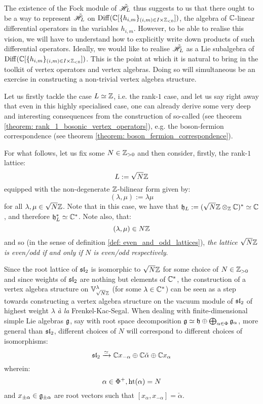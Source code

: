         The existence of the Fock module of $\tilde{\scrH}_L$ thus suggests to us that there ought to be a way to represent $\tilde{\scrH}_L$ on $\Diff(\bbC[ \{h_{i, m}\}_{(i, m) \in I \x \Z_{< 0}} ])$, the algebra of $\bbC$-linear differential operators in the variables $h_{i, m}$. However, to be able to realise this vision, we will have to understand how to explicitly write down products of such differential operators. Ideally, we would like to realise $\tilde{\scrH}_L$ as a Lie subalgebra of $\Diff(\bbC[ \{h_{i, m}\}_{(i, m) \in I \x \Z_{< 0}} ])$. This is the point at which it is natural to bring in the toolkit of vertex operators and vertex algebras. Doing so will simultaneous be an exercise in constructing a non-trivial vertex algebra structure.

        Let us firstly tackle the case $L \cong \Z$, i.e. the rank-$1$ case, and let us say right away that even in this highly specialised case, one can already derive some very deep and interesting consequences from the construction of so-called  (see theorem \ref{theorem: rank_1_bosonic_vertex_operators}), e.g. the boson-fermion correspondence (see theorem \ref{theorem: boson_fermion_correspondence}).
        
        For what follows, let us fix some $N \in \Z_{> 0}$ and then consider, firstly, the rank-$1$ lattice:
            $$L := \sqrt{N} \Z$$
        equipped with the non-degenerate $\Z$-bilinear form given by:
            $$(\lambda, \mu) := \lambda \mu$$
        for all $\lambda, \mu \in \sqrt{N} \Z$. Note that in this case, we have that $\h_L := (\sqrt{N}\Z \tensor_{\Z} \bbC)^* \cong \bbC$, and therefore $\h_L^* \cong \bbC^*$. Note also, that:
            $$(\lambda, \mu) \in N \Z$$
        and so (in the sense of definition \ref{def: even_and_odd_lattices}), \textit{the lattice $\sqrt{N} \Z$ is even/odd if and only if $N$ is even/odd respectively}. 
        \begin{remark}
            Since the root lattice of $\sl_2$ is isomorphic to $\sqrt{N} \Z$ for some choice of $N \in \Z_{> 0}$ and since weights of $\sl_2$ are nothing but elements of $\bbC^*$, the construction of a vertex algebra structure on $\V_{\sqrt{N} \Z}^{\lambda}$ (for some $\lambda \in \bbC^*$) can be seen as a step towards constructing a vertex algebra structure on the vacuum module of $\sl_2$ of highest weight $\lambda$ \textit{\`a la} Frenkel-Kac-Segal. When dealing with finite-dimensional simple Lie algebras $\g$, say with root space decomposition $\g \cong \h \oplus \bigoplus_{\alpha \in \Phi} \g_{\alpha}$, more general than $\sl_2$, different choices of $N$ will correspond to different choices of isomorphisms:
                $$\sl_2 \xrightarrow[]{\cong} \bbC x_{-\alpha} \oplus \bbC \check{\alpha} \oplus \bbC x_{\alpha}$$
            wherein:
                $$\alpha \in \Phi^+, \height(\alpha) = N$$
            and $x_{\pm \alpha} \in \g_{\pm \alpha}$ are root vectors such that $[x_{\alpha}, x_{-\alpha}] = \check{\alpha}$.
        \end{remark}

